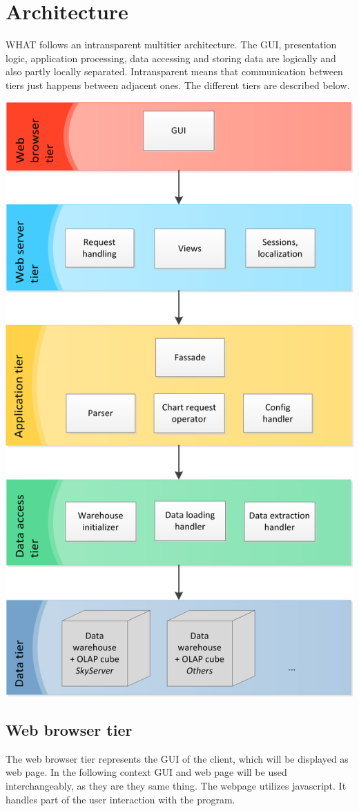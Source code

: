 \section{Architecture}

WHAT follows an intransparent multitier architecture. 
The GUI, presentation logic, application processing, data accessing and storing data
are logically and also partly locally separated. Intransparent means that communication
between tiers just happens between adjacent ones. The different tiers are described below.


\begin{center}
\includegraphics[width=0.6\linewidth]{Pictures/ArchiColor.png}
\end{center}   


\subsection{Web browser tier}
The web browser tier represents the GUI of the client, which will be displayed as web page.
In the following context GUI and web page will be used interchangeably, as they are they same thing.
The webpage utilizes javascript.
It handles part of the user interaction with the program.

